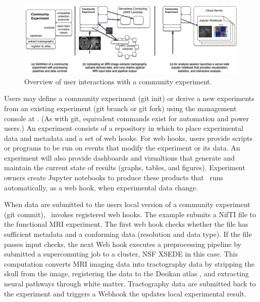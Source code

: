 \begin{figure}
  \begin{center}
    \hspace{-10pt}
    \includegraphics[width=6.7in]{figs/blcifig.pdf}
  \caption{\small Overview of user interactions with a community experiment.}
  \label{fig:services}
  \end{center}
\end{figure}

Users may define a community experiment (\textsf{git init}) or derive a new experiments 
from an existing experiment (\textsf{git branch} or \textsf{git fork}) using 
the management console at \name.  (As with git, equivalent commands exist
for automation and power users.)  An experiment consists of a repository in which to 
place experimental data and metadata and a set of web hooks. 
For web hooks, users provide scripts or programs to be run on events that modify
the experiment or its data.  An experiment will also provide dashboards and 
vizualtions that generate and maintain the current state of results 
(graphs, tables, and figures).  Experiment owners create Jupyter notebooks to produce
these products that \name~runs automatically, as a web hook, when experimental
data change.

When data are submitted to the users local version of a community 
experiment (\textsf{git commit}), \name~invokes registered web hooks.  The example submits a NifTI file to the functional 
MRI experiment.  The first web hook checks whether the file has sufficient metadata and 
a conforming data (resolution and data type). 
If the file passes input checks, the next
Web hook executes a preprocessing pipeline by submitted a supercomuting job to a
cluster, NSF XSEDE in this case.  This computation converts MRI imaging data into 
tractography data by stripping the skull from the image, registering the data to 
the Desikan atlas \cite{Desikan2006a}, and extracting neural pathways through white matter. Tractography data
are submitted back to the experiment and triggers a Webhook the updates local 
experimental result.

